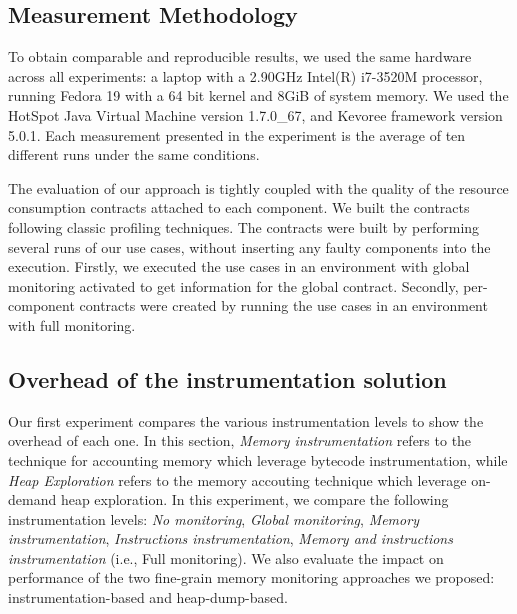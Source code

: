 \subsection{Measurement Methodology} \label{sec:measurement_metodology}
To obtain comparable and reproducible results, we used the same hardware across all experiments: a laptop with a 2.90GHz Intel(R) i7-3520M processor, running Fedora 19 with a 64 bit kernel and 8GiB of system memory.
We used the HotSpot Java Virtual Machine version 1.7.0\_67, and Kevoree framework version 5.0.1.
Each measurement presented in the experiment is the average of ten different runs under the same conditions. 

The evaluation of our approach is tightly coupled with the quality of the resource consumption contracts attached to each component.
We built the contracts following classic profiling techniques. 
The contracts were built by performing several runs of our use cases, without inserting any faulty components into the execution.
Firstly, we executed the use cases in an environment with global monitoring activated to get information for the global contract.
Secondly, per-component contracts were created by running the use cases in an environment with full monitoring.

\subsection{Overhead of the instrumentation solution\label{sec:OverheadFullMonitoring}}
Our first experiment compares the various instrumentation levels to show the overhead of each one. 
In this section, \emph{Memory instrumentation} refers to the technique for accounting memory which leverage bytecode instrumentation, while \textit{Heap Exploration} refers to the memory accouting technique which leverage on-demand heap exploration.
In this experiment, we compare the following instrumentation levels: \emph{No monitoring}, \emph{Global monitoring}, \emph{Memory instrumentation}, \emph{Instructions instrumentation}, \emph{Memory and instructions instrumentation} (i.e., Full monitoring).
We also evaluate the impact on performance of the two fine-grain memory monitoring approaches we proposed: instrumentation-based and heap-dump-based.

